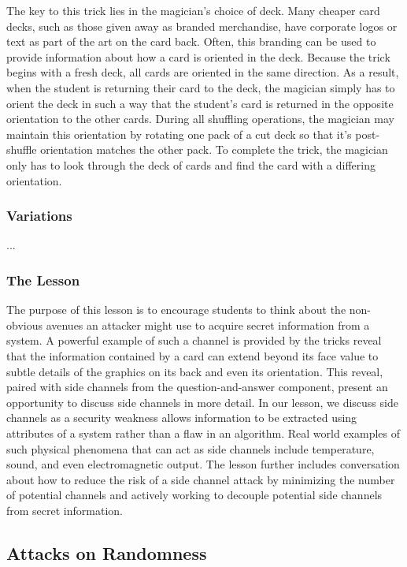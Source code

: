 The key to this trick lies in the magician's choice of deck.  Many cheaper card
decks, such as those given away as branded merchandise,
have corporate logos or
text as part of the art on the card back.  Often, this branding can be used to
provide information about how a card is oriented in the deck.  Because the trick
begins with a fresh deck, all cards are oriented in the same direction.  As a
result, when the student is returning their card to the deck, the magician
simply has to orient the deck in such a way that the student's card is returned
in the opposite orientation to the other cards.  During all shuffling
operations, the magician may maintain this orientation by rotating one pack of a
cut deck so that it's post-shuffle orientation matches the other pack.
To complete the trick, the magician only has to look through the deck of cards
and find the card with a differing orientation.

\subsubsection{Variations}

...

\subsubsection{The Lesson}

The purpose of this lesson is to encourage students to think about the
non-obvious avenues an attacker might use to acquire secret information from a
system.  A powerful example of such a channel is provided by the tricks reveal
that the information contained by a card can extend beyond its face value to
subtle details of the graphics on its back and even its orientation.  This
reveal, paired with side channels from the question-and-answer component,
present an opportunity to discuss side channels in more detail.
In our lesson, we discuss side channels as
a security weakness allows information to be extracted using attributes
of a system rather than a flaw in an
algorithm.
Real world examples of such
physical phenomena
that can act as side channels
include temperature,
sound,
and even electromagnetic output.
The lesson further includes conversation about how to
reduce the risk of a side channel attack
by minimizing the number of potential channels
and actively working to decouple potential
side channels from secret information.

\subsection{Attacks on Randomness}


